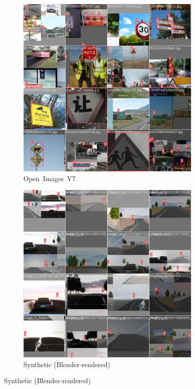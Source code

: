 \documentclass[journal]{IEEEtran}
\begin{document}
\begin{figure}[h]
    \centering
    \begin{subfigure}[t]{0.48\linewidth}
        \centering
        \includegraphics[width=\linewidth]{images/open_source.jpg}
        \caption{Open Images V7}
        \label{fig:open_images}
    \end{subfigure}\hfill
    \begin{subfigure}[t]{0.48\linewidth}
        \centering
        \includegraphics[width=\linewidth]{images/synthetic.jpg}
        \caption{Synthetic (Blender‑rendered)}
        \label{fig:synthetic}
    \end{subfigure}


\end{figure}
\end{document}
